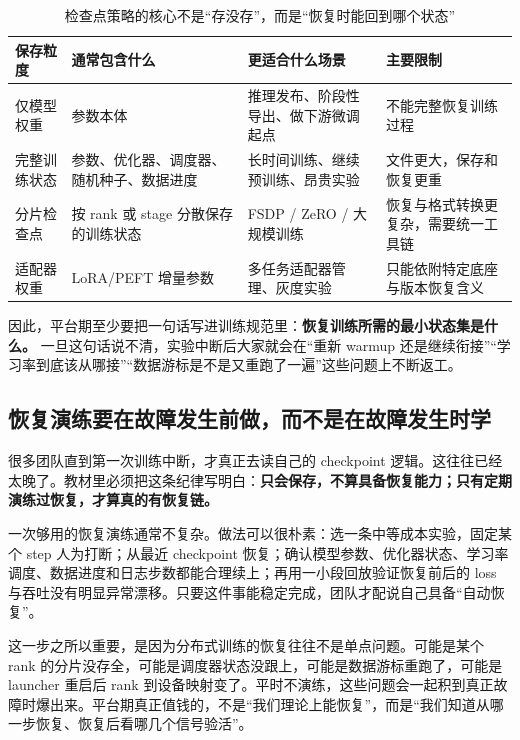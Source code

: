 \begin{table}[H]
\centering
\small
\begin{tabularx}{\textwidth}{>{\raggedright\arraybackslash}p{2.7cm}>{\raggedright\arraybackslash}p{3.2cm}>{\raggedright\arraybackslash}p{2.8cm}>{\raggedright\arraybackslash}X}
\toprule
\textbf{保存粒度} & \textbf{通常包含什么} & \textbf{更适合什么场景} & \textbf{主要限制} \\
\midrule
仅模型权重 & 参数本体 & 推理发布、阶段性导出、做下游微调起点 & 不能完整恢复训练过程 \\
完整训练状态 & 参数、优化器、调度器、随机种子、数据进度 & 长时间训练、继续预训练、昂贵实验 & 文件更大，保存和恢复更重 \\
分片检查点 & 按 rank 或 stage 分散保存的训练状态 & FSDP / ZeRO / 大规模训练 & 恢复与格式转换更复杂，需要统一工具链 \\
适配器权重 & LoRA/PEFT 增量参数 & 多任务适配器管理、灰度实验 & 只能依附特定底座与版本恢复含义 \\
\bottomrule
\end{tabularx}
\caption{检查点策略的核心不是“存没存”，而是“恢复时能回到哪个状态”}
\label{tab:checkpoint-granularity}
\end{table}

因此，平台期至少要把一句话写进训练规范里：\textbf{恢复训练所需的最小状态集是什么。} 一旦这句话说不清，实验中断后大家就会在“重新 warmup 还是继续衔接”“学习率到底该从哪接”“数据游标是不是又重跑了一遍”这些问题上不断返工。

\subsection{恢复演练要在故障发生前做，而不是在故障发生时学}
很多团队直到第一次训练中断，才真正去读自己的 checkpoint 逻辑。这往往已经太晚了。教材里必须把这条纪律写明白：\textbf{只会保存，不算具备恢复能力；只有定期演练过恢复，才算真的有恢复链。}

一次够用的恢复演练通常不复杂。做法可以很朴素：选一条中等成本实验，固定某个 step 人为打断；从最近 checkpoint 恢复；确认模型参数、优化器状态、学习率调度、数据进度和日志步数都能合理续上；再用一小段回放验证恢复前后的 loss 与吞吐没有明显异常漂移。只要这件事能稳定完成，团队才配说自己具备“自动恢复”。

这一步之所以重要，是因为分布式训练的恢复往往不是单点问题。可能是某个 rank 的分片没存全，可能是调度器状态没跟上，可能是数据游标重跑了，可能是 launcher 重启后 rank 到设备映射变了。平时不演练，这些问题会一起积到真正故障时爆出来。平台期真正值钱的，不是“我们理论上能恢复”，而是“我们知道从哪一步恢复、恢复后看哪几个信号验活”。

